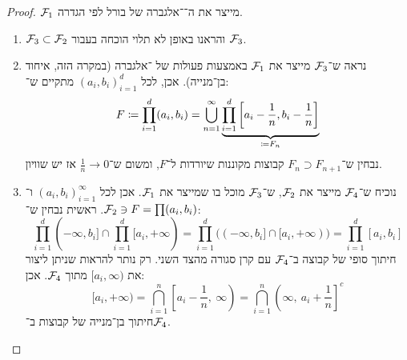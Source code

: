\documentclass[]{../../../../tex/classes/homework}
\begin{document}
	\begin{proof}

		$\mathcal{F}_1$ מייצר את ה־\ס־אלגברה של בורל לפי הגדרה. 
		\begin{enumerate}
			\item $\mathcal{F}_3 \subset \mathcal{F}_2$ והראנו באופן לא תלוי הוכחה בעבור $\mathcal{F}_3$. 
			\item נראה ש־$\mathcal{F}_3$ מייצר את $\mathcal{F}_1$ באמצעות פעולות של \ס־אלגברה (במקרה הזה, איחוד בן־מנייה). אכן, לכל $(a_i, b_i)_{i = 1}^{d}$ מתקיים ש־: 
			\[ F \coloneqq \prod_{i = 1}^{d} (a_i, b_i) = \bigcup_{n = 1}^{\infty}\underbrace{\prod_{i = 1}^{d}\left [ a_i - \frac{1}{n}, b_i - \frac{1}{n} \right ]}_{\coloneqq F_n} \]
			נבחין ש־$F_{n} \supset F_{n + 1}$ קבוצות מקוננות שיורדות ל־$F$, ומשום ש־$\frac{1}{n} \to 0$ אז יש שוויון. 
			\item נוכיח ש־$\mathcal{F}_4$ מייצר את $\mathcal{F}_2$, ש־$\mathcal{F}_3$ מוכל בו שמייצר את $\mathcal{F}_1$. אכן לכל $(a_i, b_i)_{i = 1}^{\infty}$ ו־$\mathcal{F}_2 \ni F = \prod (a_i, b_i)$. ראשית נבחין ש־: 
			\[ \prod_{i =1}^{d} (-\infty, b_i] \cap \prod_{i =1}^{d} [a_i, +\infty) = \prod_{i =1}^{d} \big((-\infty, b_i] \cap [a_i, +\infty)\big) = \prod_{i = 1}^{d}[a_i, b_i] \]
			חיתוך סופי של קבוצה ב־$\mathcal{F}_4$ עם קרן סגורה מהצד השני. רק נותר להראות שניתן ליצור את $[a_i, \infty)$ מתוך $\mathcal{F}_4$. אכן: 
			\[ [a_i, +\infty) = \bigcap_{i = 1}^{n}{\left[a_i - \frac{1}{n}, \ \infty\right)} = \bigcap_{i = 1}^{n}{\left(\infty, \ a_i + \frac{1}{n}\right]}^{c} \]
			חיתוך בן־מנייה של קבוצות ב־$\mathcal{F}_4$. 
		\end{enumerate}
	\end{proof}
	
	
	\ndoc
\end{document}
